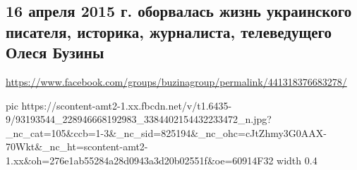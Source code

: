  
 
 
 
 
\subsection{16 апреля 2015 г. оборвалась жизнь украинского писателя, историка, журналиста, телеведущего Олеся Бузины}
\url{https://www.facebook.com/groups/buzinagroup/permalink/441318376683278/}

\ifcmt
  pic https://scontent-amt2-1.xx.fbcdn.net/v/t1.6435-9/93193544_228946668192983_3384402154432233472_n.jpg?_nc_cat=105&ccb=1-3&_nc_sid=825194&_nc_ohc=cJtZhmy3G0AAX-70Wkt&_nc_ht=scontent-amt2-1.xx&oh=276e1ab55284a28d0943a3d20b02551f&oe=60914F32
  width 0.4
\fi

